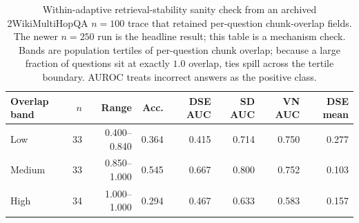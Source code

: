 \begin{table}[t]
\centering
\small
\caption{%
  Within-adaptive retrieval-stability sanity check from an archived
  2WikiMultiHopQA $n=100$ trace that retained per-question chunk-overlap
  fields.  The newer $n=250$ run is the headline result; this table is a
  mechanism check.
  Bands are population tertiles of per-question chunk overlap; because a
  large fraction of questions sit at exactly $1.0$ overlap, ties spill
  across the tertile boundary.
  AUROC treats incorrect answers as the positive class.%
}
\label{tab:within_adaptive_stability}
\setlength{\tabcolsep}{3.5pt}
\begin{tabular}{@{}lrrrrrrr@{}}
\toprule
Overlap band & $n$ & Range & Acc. & DSE AUC & SD AUC & VN AUC & DSE mean \\
\midrule
Low & 33 & 0.400--0.840 & 0.364 & 0.415 & 0.714 & 0.750 & 0.277 \\
Medium & 33 & 0.850--1.000 & 0.545 & 0.667 & 0.800 & 0.752 & 0.103 \\
High & 34 & 1.000--1.000 & 0.294 & 0.467 & 0.633 & 0.583 & 0.157 \\
\bottomrule
\end{tabular}
\end{table}
